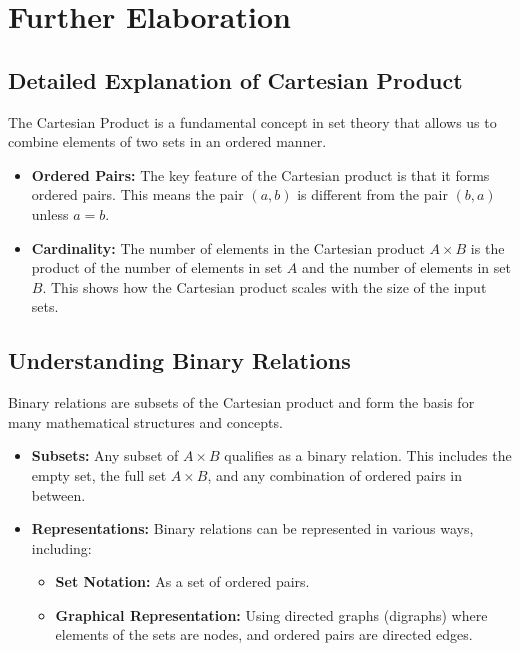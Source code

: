 \documentclass{report}
\begin{document}

\section{Further Elaboration}

\subsection{Detailed Explanation of Cartesian Product}
The Cartesian Product is a fundamental concept in set theory that allows us to combine elements of two sets in an ordered manner.

\begin{itemize}
	\item \textbf{Ordered Pairs:} The key feature of the Cartesian product is that it forms ordered pairs. This means the pair $(a, b)$ is different from the pair $(b, a)$ unless $a = b$.
	\item \textbf{Cardinality:} The number of elements in the Cartesian product $A \times B$ is the product of the number of elements in set $A$ and the number of elements in set $B$. This shows how the Cartesian product scales with the size of the input sets.
\end{itemize}

\subsection{Understanding Binary Relations}
Binary relations are subsets of the Cartesian product and form the basis for many mathematical structures and concepts.

\begin{itemize}
	\item \textbf{Subsets:} Any subset of $A \times B$ qualifies as a binary relation. This includes the empty set, the full set $A \times B$, and any combination of ordered pairs in between.
	\item \textbf{Representations:} Binary relations can be represented in various ways, including:
	      \begin{itemize}
		      \item \textbf{Set Notation:} As a set of ordered pairs.
		      \item \textbf{Graphical Representation:} Using directed graphs (digraphs) where elements of the sets are nodes, and ordered pairs are directed edges.
	      \end{itemize}
\end{itemize}
\end{document}
